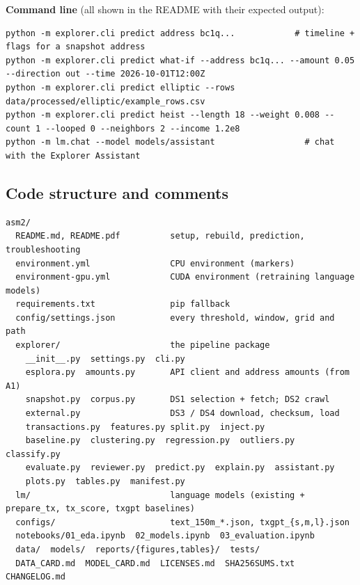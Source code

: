 \textbf{Command line} (all shown in the README with their expected output):
\begin{lstlisting}
python -m explorer.cli predict address bc1q...            # timeline + flags for a snapshot address
python -m explorer.cli predict what-if --address bc1q... --amount 0.05 --direction out --time 2026-10-01T12:00Z
python -m explorer.cli predict elliptic --rows data/processed/elliptic/example_rows.csv
python -m explorer.cli predict heist --length 18 --weight 0.008 --count 1 --looped 0 --neighbors 2 --income 1.2e8
python -m lm.chat --model models/assistant                  # chat with the Explorer Assistant
\end{lstlisting}

\subsection{Code structure and comments}
\label{sec:codequality}

\begin{lstlisting}
asm2/
  README.md, README.pdf          setup, rebuild, prediction, troubleshooting
  environment.yml                CPU environment (markers)
  environment-gpu.yml            CUDA environment (retraining language models)
  requirements.txt               pip fallback
  config/settings.json           every threshold, window, grid and path
  explorer/                      the pipeline package
    __init__.py  settings.py  cli.py
    esplora.py  amounts.py       API client and address amounts (from A1)
    snapshot.py  corpus.py       DS1 selection + fetch; DS2 crawl
    external.py                  DS3 / DS4 download, checksum, load
    transactions.py  features.py split.py  inject.py
    baseline.py  clustering.py  regression.py  outliers.py  classify.py
    evaluate.py  reviewer.py  predict.py  explain.py  assistant.py
    plots.py  tables.py  manifest.py
  lm/                            language models (existing + prepare_tx, tx_score, txgpt baselines)
  configs/                       text_150m_*.json, txgpt_{s,m,l}.json
  notebooks/01_eda.ipynb  02_models.ipynb  03_evaluation.ipynb
  data/  models/  reports/{figures,tables}/  tests/
  DATA_CARD.md  MODEL_CARD.md  LICENSES.md  SHA256SUMS.txt  CHANGELOG.md
\end{lstlisting}

